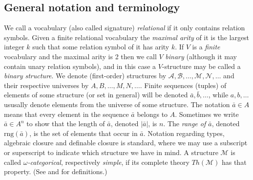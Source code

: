 \documentclass[11pt, twoside]{amsart}
\numberwithin{equation}{section}
\newcommand{\tp}{\mathrm{tp}}
\newcommand{\acl}{\mathrm{acl}}
\newcommand{\dcl}{\mathrm{dcl}}
\newcommand{\es}{\emptyset}
\newcommand{\mcA}{\mathcal{A}}
\newcommand{\mcB}{\mathcal{B}}
\newcommand{\mcM}{\mathcal{M}}
\newcommand{\mcN}{\mathcal{N}}
\newcommand{\rng}{\mathrm{rng}}
\begin{document}
\subsection{General notation and terminology}

\noindent
We call a vocabulary (also called signature) {\em relational} if it only contains relation symbols.
Given a finite relational vocabulary the {\em maximal arity} of it is the largest integer $k$ such that some relation symbol of it has arity $k$.
If  $V$ is a {\em  finite} vocabulary and the maximal arity is 2 then we call $V$ {\em binary}
(although it may contain unary relation symbols), and in this case a $V$-structure may be called a {\em binary structure}.
We denote (first-order) structures by $\mcA, \mcB, \ldots, \mcM, \mcN, \ldots$ and their respective universes by 
$A, B, \ldots, M, N, \ldots$. 
Finite sequences (tuples) of elements of some structure (or set in general) will be denoted
$\bar{a}, \bar{b}, \ldots$, while $a, b, \ldots$ ususally denote elements from the universe of some structure.
The notation $\bar{a} \in A$ means that every element in the sequence $\bar{a}$ belongs to $A$. 
Sometimes we write $\bar{a} \in A^n$ to show that the length of $\bar{a}$, denoted $|\bar{a}|$, is $n$.
The {\em range of $\bar{a}$}, denoted $\rng(\bar{a})$, is the set of elements that occur in $\bar{a}$.
Notation regarding types, algebraic closure and definable closure is standard, where we may use
a subscript or superscript to indicate which structure we have in mind.
A structure $\mcM$ is called {\em $\omega$-categorical}, respectively {\em simple}, if 
its complete theory $Th(\mcM)$ has that property. (See \cite{Hod} and \cite{Cas, Wag} for definitions.)


\end{document}

